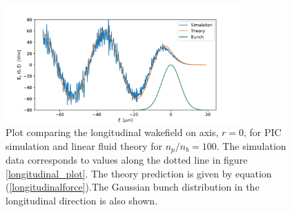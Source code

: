 \vspace{-50pt}
\begin{figure}
\centering
\includegraphics[width=0.8\textwidth]{test2.pdf}
\caption{\small{Plot comparing the longitudinal wakefield on axis, $r=0$, for PIC simulation and linear fluid theory for $n_p/n_b=100$. The simulation data corresponds to values along the dotted line in figure \ref{longitudinal_plot}. The theory prediction is given by equation  (\ref{longitudinalforce}).The Gaussian bunch distribution in the longitudinal direction is also shown.}}
\label{theory_vs_simulation_longitudinal}
\end{figure}\vspace{50pt}
